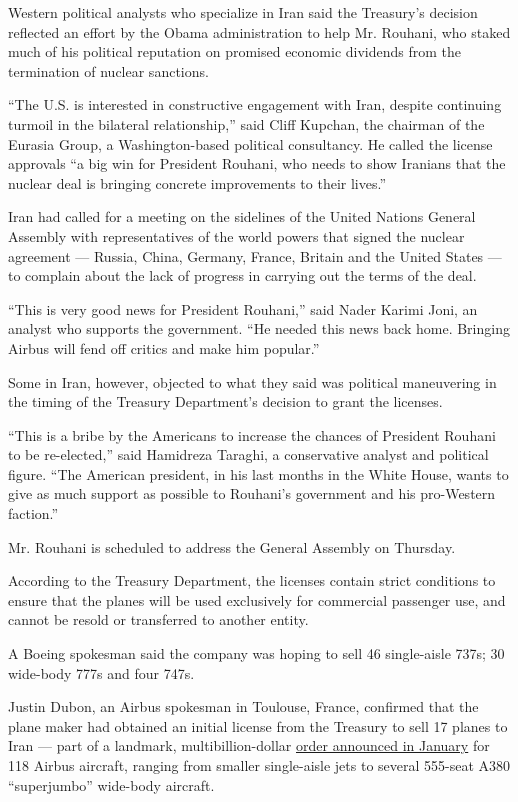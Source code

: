 Western political analysts who specialize in Iran said the Treasury's
decision reflected an effort by the Obama administration to help Mr.
Rouhani, who staked much of his political reputation on promised
economic dividends from the termination of nuclear sanctions.

``The U.S. is interested in constructive engagement with Iran, despite
continuing turmoil in the bilateral relationship,'' said Cliff Kupchan,
the chairman of the Eurasia Group, a Washington-based political
consultancy. He called the license approvals ``a big win for President
Rouhani, who needs to show Iranians that the nuclear deal is bringing
concrete improvements to their lives.''

Iran had called for a meeting on the sidelines of the United Nations
General Assembly with representatives of the world powers that signed
the nuclear agreement --- Russia, China, Germany, France, Britain and
the United States --- to complain about the lack of progress in carrying
out the terms of the deal.

``This is very good news for President Rouhani,'' said Nader Karimi
Joni, an analyst who supports the government. ``He needed this news back
home. Bringing Airbus will fend off critics and make him popular.''

Some in Iran, however, objected to what they said was political
maneuvering in the timing of the Treasury Department's decision to grant
the licenses.

``This is a bribe by the Americans to increase the chances of President
Rouhani to be re-elected,'' said Hamidreza Taraghi, a conservative
analyst and political figure. ``The American president, in his last
months in the White House, wants to give as much support as possible to
Rouhani's government and his pro-Western faction.''

Mr. Rouhani is scheduled to address the General Assembly on Thursday.

According to the Treasury Department, the licenses contain strict
conditions to ensure that the planes will be used exclusively for
commercial passenger use, and cannot be resold or transferred to another
entity.

A Boeing spokesman said the company was hoping to sell 46 single-aisle
737s; 30 wide-body 777s and four 747s.

Justin Dubon, an Airbus spokesman in Toulouse, France, confirmed that
the plane maker had obtained an initial license from the Treasury to
sell 17 planes to Iran --- part of a landmark, multibillion-dollar
\href{http://www.nytimes3xbfgragh.onion/2016/01/26/business/international/airbus-iran-aircraft-talks.html}{order
announced in January} for 118 Airbus aircraft, ranging from smaller
single-aisle jets to several 555-seat A380 ``superjumbo'' wide-body
aircraft.

